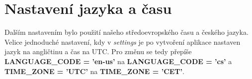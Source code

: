 \section{Nastavení jazyka a času}

Dalším nastavením bylo použití našeho středoevropského času a českého jazyka. Velice jednoduché nastavení, kdy v \emph{settings} je po vytvoření aplikace nastaven jazyk na angličtinu a čas na UTC. Pro změnu se tedy přepíše \textbf{LANGUAGE\_CODE = 'en-us'} na \textbf{LANGUAGE\_CODE = 'cs'} a \textbf{TIME\_ZONE = 'UTC'} na \textbf{TIME\_ZONE = 'CET'}.






















